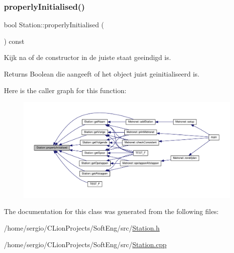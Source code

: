 \subsubsection{\texorpdfstring{properly\+Initialised()}{properlyInitialised()}}
{\footnotesize\ttfamily bool Station\+::properly\+Initialised (\begin{DoxyParamCaption}{ }\end{DoxyParamCaption}) const}



Kijk na of de constructor in de juiste staat geeindigd is. 

\begin{DoxyReturn}{Returns}
Boolean die aangeeft of het object juist geinitialiseerd is. 
\end{DoxyReturn}
Here is the caller graph for this function\+:\nopagebreak
\begin{figure}[H]
\begin{center}
\leavevmode
\includegraphics[width=350pt]{class_station_a9ce626dd0599e3ea8107404a59c21e16_icgraph}
\end{center}
\end{figure}


The documentation for this class was generated from the following files\+:\begin{DoxyCompactItemize}
\item 
/home/sergio/\+C\+Lion\+Projects/\+Soft\+Eng/src/\hyperlink{_station_8h}{Station.\+h}\item 
/home/sergio/\+C\+Lion\+Projects/\+Soft\+Eng/src/\hyperlink{_station_8cpp}{Station.\+cpp}\end{DoxyCompactItemize}

